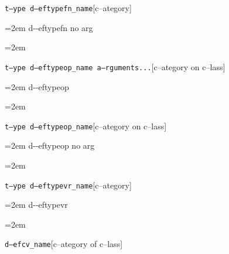 \documentclass{book}
\begin{document}
\endgroup{}%
\noindent\texttt\bgroup{}t--ype d--eftypefn\_name\egroup{}\hfill[c--ategory]



%
\par\begingroup\obeylines\obeyspaces\frenchspacing\leftskip=2em\relax\parskip=0pt\relax\ttfamily{}%
d{-}{-}eftypefn no arg
\endgroup{}%
\par\begingroup\obeylines\obeyspaces\frenchspacing\leftskip=2em\relax\parskip=0pt\relax\ttfamily{}%

\endgroup{}%
\noindent\texttt\bgroup{}t--ype d--eftypeop\_name a--rguments...\egroup{}\hfill[c--ategory on c--lass]



%
\par\begingroup\obeylines\obeyspaces\frenchspacing\leftskip=2em\relax\parskip=0pt\relax\ttfamily{}%
d{-}{-}eftypeop
\endgroup{}%
\par\begingroup\obeylines\obeyspaces\frenchspacing\leftskip=2em\relax\parskip=0pt\relax\ttfamily{}%

\endgroup{}%
\noindent\texttt\bgroup{}t--ype d--eftypeop\_name\egroup{}\hfill[c--ategory on c--lass]



%
\par\begingroup\obeylines\obeyspaces\frenchspacing\leftskip=2em\relax\parskip=0pt\relax\ttfamily{}%
d{-}{-}eftypeop no arg
\endgroup{}%
\par\begingroup\obeylines\obeyspaces\frenchspacing\leftskip=2em\relax\parskip=0pt\relax\ttfamily{}%

\endgroup{}%
\noindent\texttt\bgroup{}t--ype d--eftypevr\_name\egroup{}\hfill[c--ategory]



%
\par\begingroup\obeylines\obeyspaces\frenchspacing\leftskip=2em\relax\parskip=0pt\relax\ttfamily{}%
d{-}{-}eftypevr
\endgroup{}%
\par\begingroup\obeylines\obeyspaces\frenchspacing\leftskip=2em\relax\parskip=0pt\relax\ttfamily{}%

\endgroup{}%
\noindent\texttt\bgroup{}d--efcv\_name\egroup{}\hfill[c--ategory of c--lass]
\end{document}
